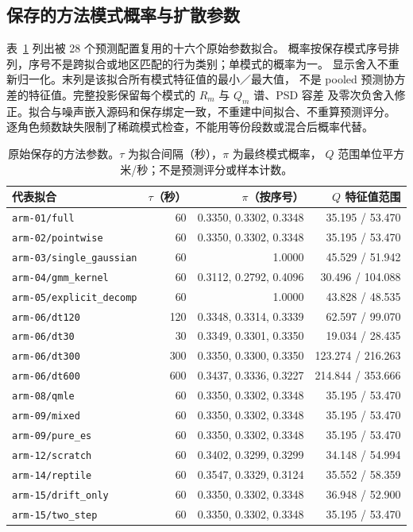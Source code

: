 \documentclass[UTF8,11pt]{ctexart}
\begin{document}
\subsection{保存的方法模式概率与扩散参数}
\label{sec:method-noise-parameters}
表~\ref{tab:method-noise-parameters} 列出被 28 个预测配置复用的十六个原始参数拟合。
概率按保存模式序号排列，序号不是跨拟合或地区匹配的行为类别；单模式的概率为一。
显示舍入不重新归一化。末列是该拟合所有模式特征值的最小／最大值，
不是 pooled 预测协方差的特征值。完整投影保留每个模式的 $R_m$ 与 $Q_m$ 谱、PSD 容差
及零次负舍入修正。拟合与噪声嵌入源码和保存绑定一致，不重建中间拟合、不重算预测评分。
逐角色频数缺失限制了稀疏模式检查，不能用等份段数或混合后概率代替。

\begin{table}[htbp]
\centering\footnotesize
\caption{原始保存的方法参数。$\tau$ 为拟合间隔（秒），$\pi$ 为最终模式概率，
$Q$ 范围单位平方米/秒；不是预测评分或样本计数。}
\label{tab:method-noise-parameters}
\begin{tabular}{lrrr}
\toprule
代表拟合 & $\tau$（秒） & $\pi$（按序号） & $Q$ 特征值范围\\
\midrule
\texttt{arm-01/full} & 60 & 0.3350, 0.3302, 0.3348 & 35.195 / 53.470\\
\texttt{arm-02/pointwise} & 60 & 0.3350, 0.3302, 0.3348 & 35.195 / 53.470\\
\texttt{arm-03/single\_gaussian} & 60 & 1.0000 & 45.529 / 51.942\\
\texttt{arm-04/gmm\_kernel} & 60 & 0.3112, 0.2792, 0.4096 & 30.496 / 104.088\\
\texttt{arm-05/explicit\_decomp} & 60 & 1.0000 & 43.828 / 48.535\\
\texttt{arm-06/dt120} & 120 & 0.3348, 0.3314, 0.3339 & 62.597 / 99.070\\
\texttt{arm-06/dt30} & 30 & 0.3349, 0.3301, 0.3350 & 19.034 / 28.435\\
\texttt{arm-06/dt300} & 300 & 0.3350, 0.3300, 0.3350 & 123.274 / 216.263\\
\texttt{arm-06/dt600} & 600 & 0.3437, 0.3336, 0.3227 & 214.844 / 353.666\\
\texttt{arm-08/qmle} & 60 & 0.3350, 0.3302, 0.3348 & 35.195 / 53.470\\
\texttt{arm-09/mixed} & 60 & 0.3350, 0.3302, 0.3348 & 35.195 / 53.470\\
\texttt{arm-09/pure\_es} & 60 & 0.3350, 0.3302, 0.3348 & 35.195 / 53.470\\
\texttt{arm-12/scratch} & 60 & 0.3402, 0.3299, 0.3299 & 34.148 / 54.994\\
\texttt{arm-14/reptile} & 60 & 0.3547, 0.3329, 0.3124 & 35.552 / 58.359\\
\texttt{arm-15/drift\_only} & 60 & 0.3350, 0.3302, 0.3348 & 36.948 / 52.900\\
\texttt{arm-15/two\_step} & 60 & 0.3350, 0.3302, 0.3348 & 35.195 / 53.470\\
\bottomrule
\end{tabular}
\end{table}
\end{document}
